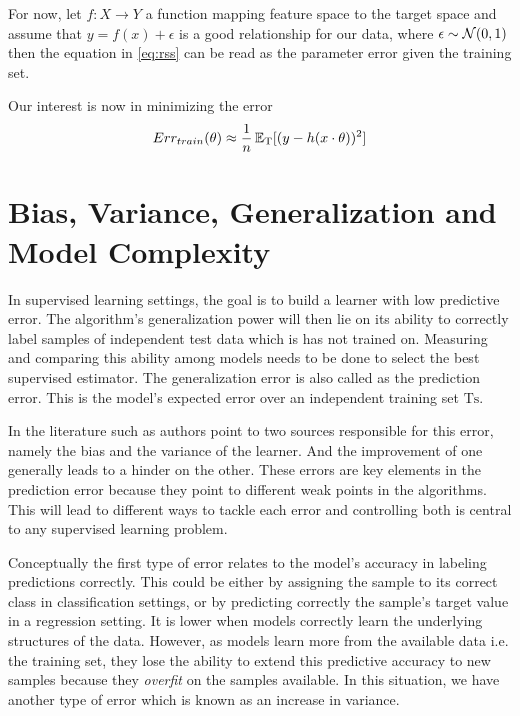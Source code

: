 For now, let $f: X \rightarrow Y$ a function mapping feature space to the target space and assume that $y  =  f(x)  +  \epsilon $ is a good relationship for our data, where $\epsilon \sim \operatorname{\mathcal{N}}(0,1) $ then the equation in \ref{eq:rss} can be read as the parameter error given the training set.

Our interest is now in minimizing the error
\begin{equation}
Err_{train}(\theta) \approx \frac{1}{n} \operatorname{\mathbb{E}}_{ \mathrm{T}}[(y - h(x \cdot \theta) )^2]
\end{equation}


\section{Bias, Variance, Generalization and Model Complexity}\label{section-biasVariance}

In supervised learning settings, the goal is to build a learner with low predictive error. The algorithm's generalization power will then lie on its ability to correctly label samples of independent test data which is has not trained on. Measuring and comparing this ability among models needs to be done to select the best supervised estimator. The generalization error is also called as the prediction error. This is the model's expected error over an independent training set $\mathrm{Ts}$.

In the literature such as \textcite{james-biasVarianceGeneral} authors point to two sources responsible for this error, namely the bias and the variance of the learner. And the improvement of one generally leads to a hinder on the other. These errors are key elements in the prediction error because they point to different weak points in the algorithms. This will lead to different ways to tackle each error and controlling both is central to any supervised learning problem.

Conceptually the first type of error relates to the model's accuracy in labeling predictions correctly. This could be either by assigning the sample to its correct class in classification settings, or by predicting correctly the sample's target value in a regression setting. It is lower when models correctly learn the underlying structures of the data. However, as models learn more from the available data i.e. the training set, they lose the ability to extend this predictive accuracy to new samples because they \textit{overfit} on the samples available. In this situation, we have another type of error which is known as an increase in variance.

